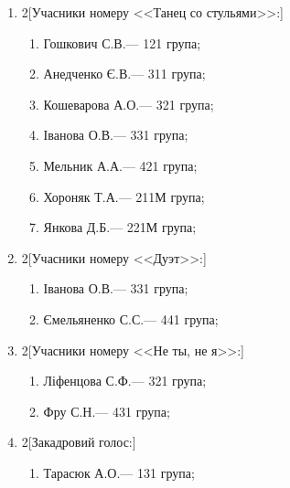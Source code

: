\documentclass[
	a4paper,
	12pt,
	oneside,
	draft
]{extreport}
\begin{document}
\begin{enumerate}[topsep=0pt,itemsep=-1ex,partopsep=1ex,parsep=1ex]
\item 
\begin{multicols}{2}[Учасники номеру <<Танец со стульями>>:] 
\begin{enumerate}[topsep=0pt,itemsep=-1ex,partopsep=1ex,parsep=1ex,label=\arabic*.]
\item Гошкович С.В.\hfill --- 121 група;
\item Анедченко Є.В.\hfill --- 311 група;
\item Кошеварова А.О.\hfill --- 321 група;
\item Іванова О.В.\hfill --- 331 група;
\item Мельник А.А.\hfill --- 421 група;
\item Хороняк Т.А.\hfill --- 211М група;
\item Янкова Д.Б.\hfill --- 221М група;
\end{enumerate}
\end{multicols}

\item 
\begin{multicols}{2}[Учасники номеру <<Дуэт>>:] 
\begin{enumerate}[topsep=0pt,itemsep=-1ex,partopsep=1ex,parsep=1ex,label=\arabic*.]
\item Іванова О.В.\hfill --- 331 група;
\item Ємельяненко С.С.\hfill --- 441 група;
\end{enumerate}
\end{multicols}

\item 
\begin{multicols}{2}[Учасники номеру <<Не ты, не я>>:] 
\begin{enumerate}[topsep=0pt,itemsep=-1ex,partopsep=1ex,parsep=1ex,label=\arabic*.]
\item Ліфенцова С.Ф.\hfill --- 321 група;
\item Фру С.Н.\hfill --- 431 група;
\end{enumerate}
\end{multicols}

\item 
\begin{multicols}{2}[Закадровий голос:] 
\begin{enumerate}[topsep=0pt,itemsep=-1ex,partopsep=1ex,parsep=1ex,label=\arabic*.]
\item Тарасюк А.О.\hfill --- 131 група;
\end{enumerate}
\end{multicols}


\end{enumerate}
\end{document}
